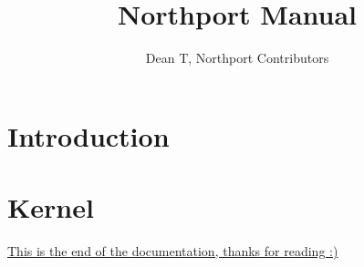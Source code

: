 \documentclass[11pt]{report}
\title{Northport Manual}
\author{Dean T, Northport Contributors}
\newcommand{\chapterpage}[1]{
    \pagestyle{empty}
    \chapter{#1}
    \newpage
    \pagestyle{fancy}
}
\begin{document}
\raggedright


\chapterpage{Introduction}




\chapterpage{Kernel}








\newpage
\href{https://www.youtube.com/watch?v=dQw4w9WgXcQ}{This is the end of the documentation, thanks for reading :)}
\end{document}
